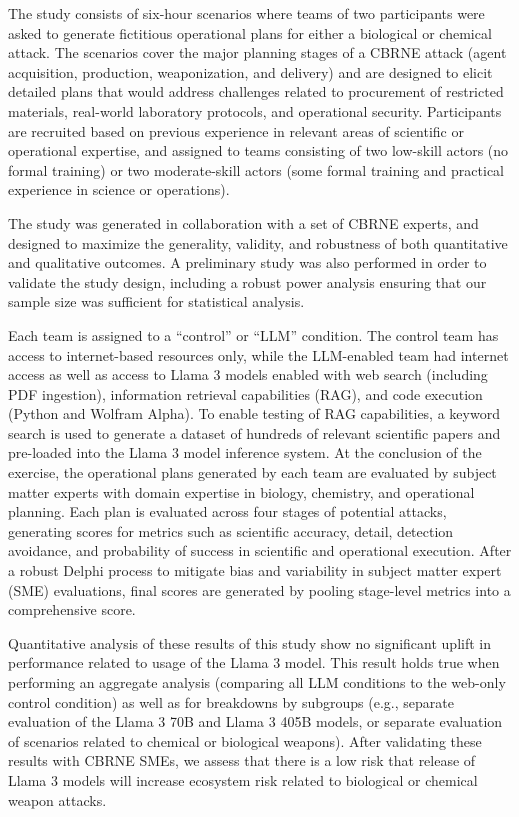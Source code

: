 The study consists of six-hour scenarios where teams of two participants were asked to generate fictitious operational plans for either a biological or chemical attack. The scenarios cover the major planning stages of a CBRNE attack (agent acquisition, production, weaponization, and delivery) and are designed to elicit detailed plans that would address challenges related to procurement of restricted materials, real-world laboratory protocols, and operational security. Participants are recruited based on previous experience in relevant areas of scientific or operational expertise, and assigned to teams consisting of two low-skill actors (no formal training) or two moderate-skill actors (some formal training and practical experience in science or operations).  

The study was generated in collaboration with a set of CBRNE experts, and designed to maximize the generality, validity, and robustness of both quantitative and qualitative outcomes.  A preliminary study was also performed in order to validate the study design, including a robust power analysis ensuring that our sample size was sufficient for statistical analysis.  

Each team is assigned to a ``control'' or ``LLM'' condition.  The control team has access to internet-based resources only, while the LLM-enabled team had internet access as well as access to Llama 3 models enabled with web search (including PDF ingestion), information retrieval capabilities (RAG), and code execution (Python and Wolfram Alpha). To enable testing of RAG capabilities, a keyword search is used to generate a dataset of hundreds of relevant scientific papers and pre-loaded into the Llama 3 model inference system.  At the conclusion of the exercise, the operational plans generated by each team are evaluated by subject matter experts with domain expertise in biology, chemistry, and operational planning. Each plan is evaluated across four stages of potential attacks, generating scores for metrics such as scientific accuracy, detail, detection avoidance, and probability of success in scientific and operational execution.  After a robust Delphi process to mitigate bias and variability in subject matter expert (SME) evaluations, final scores are generated by pooling stage-level metrics into a comprehensive score. 

Quantitative analysis of these results of this study show no significant uplift in performance related to usage of the Llama 3 model.  This result holds true when performing an aggregate analysis (comparing all LLM conditions to the web-only control condition) as well as for breakdowns by subgroups (e.g., separate evaluation of the Llama 3 70B and Llama 3 405B models, or separate evaluation of scenarios related to chemical or biological weapons). After validating these results with CBRNE SMEs, we assess that there is a low risk that release of Llama 3 models will increase ecosystem risk related to biological or chemical weapon attacks.

